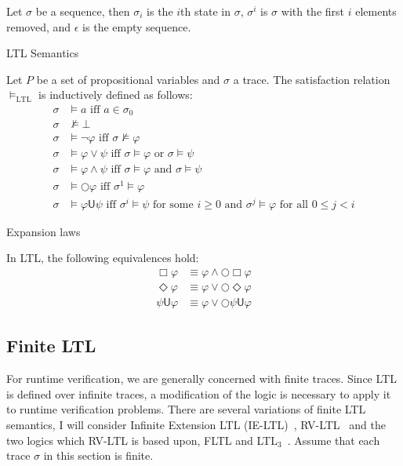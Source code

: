 \documentclass[a4paper]{article}
\newcommand{\U}{\mathsf{U}}
\newcommand{\tand}{\text{ and }}
\newcommand{\tor}{\text{ or }}
\newcommand{\tiff}{\text{ iff }}
\newcommand{\fsome}{\text{ for some }}
\newcommand{\fall}{\text{ for all }}
\begin{document}
\begin{notn}
Let $\sigma$ be a sequence, then $\sigma_i$ is the $i$th state in $\sigma$, $\sigma^i$ is $\sigma$ with the first $i$ elements removed, and $\epsilon$ is the empty sequence.
\end{notn}

\begin{defn}{LTL Semantics}\label{ltlsem}

  Let $P$ be a set of propositional variables and $\sigma$ a trace. The satisfaction relation $\vDash_{\text{LTL}}$ is inductively defined as follows:
\begin{align*}
  \sigma &\vDash a \tiff a \in \sigma_0\\
  \sigma &\nvDash \bot\\
  \sigma &\vDash \neg \varphi \tiff \sigma \nvDash \varphi\\
  \sigma &\vDash \varphi \lor \psi \tiff \sigma \vDash \varphi \tor \sigma \vDash \psi\\
  \sigma &\vDash \varphi \land \psi \tiff \sigma \vDash \varphi \tand \sigma \vDash \psi\\
  \sigma &\vDash \bigcirc \varphi \tiff \sigma^1 \vDash \varphi\\
  \sigma &\vDash \varphi \U \psi \tiff \sigma^i \vDash \psi \fsome i \geq 0 \tand \sigma^j \vDash \varphi \fall 0 \leq j < i
\end{align*}

\end{defn}

\begin{lem}{Expansion laws}\label{ltlexp}

  In LTL, the following equivalences hold:
  \begin{align}
    \Box \varphi &\equiv \varphi \land \bigcirc \Box \varphi\label{elbox}\\
    \Diamond \varphi &\equiv \varphi \lor \bigcirc \Diamond \varphi\label{eldiamond}\\
    \psi \U \varphi &\equiv \varphi \lor \bigcirc \psi \U \varphi\label{elU}
  \end{align}

\end{lem}



\subsection{Finite LTL}
For runtime verification, we are generally concerned with finite traces. Since LTL is defined over infinite traces, a modification of the logic is necessary to apply it to runtime verification problems. %
There are several variations of finite LTL semantics, I will consider Infinite Extension LTL (IE-LTL)~\autocite{rosu2005rewriting}, RV-LTL~\autocite{bauer2010comparing} and the two logics which RV-LTL is based upon, FLTL and LTL$_3$~\autocite{bauer2010comparing}.
Assume that each trace $\sigma$ in this section is finite.
\end{document}
